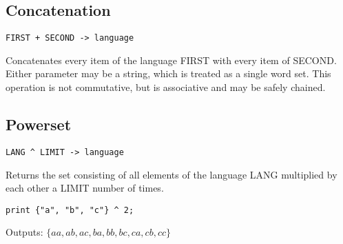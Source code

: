 \subsection{Concatenation}
\begin{center}
\begin{minipage}{5cm}
\begin{verbatim}
FIRST + SECOND -> language
\end{verbatim}
\end{minipage}
\end{center}
\begin{normalsize}
Concatenates every item of the language FIRST with every item of SECOND. Either parameter may be a string, which is treated as a single word set. This operation is not commutative, but is associative and may be safely chained.
\end{normalsize}

\subsection{Powerset}
\begin{center}
\begin{minipage}{5cm}
\begin{verbatim}
LANG ^ LIMIT -> language
\end{verbatim}
\end{minipage}
\end{center}
\begin{normalsize}
Returns the set consisting of all elements of the language LANG multiplied by each other a LIMIT number of times.
\begin{center}
\begin{minipage}{5cm}
\begin{verbatim}
print {"a", "b", "c"} ^ 2;
\end{verbatim}
\end{minipage}
\end{center}
Outputs: $ \{aa, ab, ac, ba, bb, bc, ca, cb, cc\} $
\end{normalsize}

